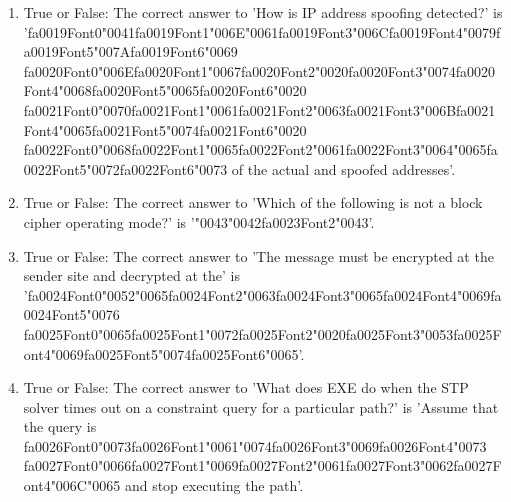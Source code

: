 \documentclass[12pt]{article}
\begin{document}
\begin{enumerate}[label=\arabic*.]
\item True or False: The correct answer to 'How is IP address spoofing detected?' is '{\csname fa0019Font0\endcsname\char"0041}{\csname fa0019Font1\endcsname\char"006E}{\char"0061}{\csname fa0019Font3\endcsname\char"006C}{\csname fa0019Font4\endcsname\char"0079}{\csname fa0019Font5\endcsname\char"007A}{\csname fa0019Font6\endcsname\char"0069} {\csname fa0020Font0\endcsname\char"006E}{\csname fa0020Font1\endcsname\char"0067}{\csname fa0020Font2\endcsname\char"0020}{\csname fa0020Font3\endcsname\char"0074}{\csname fa0020Font4\endcsname\char"0068}{\csname fa0020Font5\endcsname\char"0065}{\csname fa0020Font6\endcsname\char"0020} {\csname fa0021Font0\endcsname\char"0070}{\csname fa0021Font1\endcsname\char"0061}{\csname fa0021Font2\endcsname\char"0063}{\csname fa0021Font3\endcsname\char"006B}{\csname fa0021Font4\endcsname\char"0065}{\csname fa0021Font5\endcsname\char"0074}{\csname fa0021Font6\endcsname\char"0020} {\csname fa0022Font0\endcsname\char"0068}{\csname fa0022Font1\endcsname\char"0065}{\csname fa0022Font2\endcsname\char"0061}{\csname fa0022Font3\endcsname\char"0064}{\char"0065}{\csname fa0022Font5\endcsname\char"0072}{\csname fa0022Font6\endcsname\char"0073} of the actual and spoofed addresses'.
\item True or False: The correct answer to 'Which of the following is not a block cipher operating mode?' is '{\char"0043}{\char"0042}{\csname fa0023Font2\endcsname\char"0043}'.
\item True or False: The correct answer to 'The message must be encrypted at the sender site and decrypted at the' is '{\csname fa0024Font0\endcsname\char"0052}{\char"0065}{\csname fa0024Font2\endcsname\char"0063}{\csname fa0024Font3\endcsname\char"0065}{\csname fa0024Font4\endcsname\char"0069}{\csname fa0024Font5\endcsname\char"0076} {\csname fa0025Font0\endcsname\char"0065}{\csname fa0025Font1\endcsname\char"0072}{\csname fa0025Font2\endcsname\char"0020}{\csname fa0025Font3\endcsname\char"0053}{\csname fa0025Font4\endcsname\char"0069}{\csname fa0025Font5\endcsname\char"0074}{\csname fa0025Font6\endcsname\char"0065}'.
\item True or False: The correct answer to 'What does EXE do when the STP solver times out on a constraint query for a particular path?' is 'Assume that the query is {\csname fa0026Font0\endcsname\char"0073}{\csname fa0026Font1\endcsname\char"0061}{\char"0074}{\csname fa0026Font3\endcsname\char"0069}{\csname fa0026Font4\endcsname\char"0073} {\csname fa0027Font0\endcsname\char"0066}{\csname fa0027Font1\endcsname\char"0069}{\csname fa0027Font2\endcsname\char"0061}{\csname fa0027Font3\endcsname\char"0062}{\csname fa0027Font4\endcsname\char"006C}{\char"0065} and stop executing the path'.
\end{enumerate}
\end{document}
